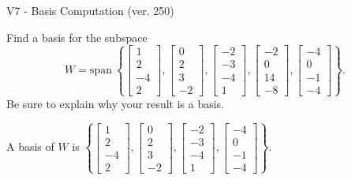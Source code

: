\begin{exercise}
  \begin{exerciseTitle}V7 - Basis Computation (ver. 250)\end{exerciseTitle}
  \begin{exerciseStatement}
    Find a basis for the subspace 
\[W=\mathrm{span}\ \left\{\left[\begin{array}{r}
1 \\
2 \\
-4 \\
2
\end{array}\right] , \left[\begin{array}{r}
0 \\
2 \\
3 \\
-2
\end{array}\right] , \left[\begin{array}{r}
-2 \\
-3 \\
-4 \\
1
\end{array}\right] , \left[\begin{array}{r}
-2 \\
0 \\
14 \\
-8
\end{array}\right] , \left[\begin{array}{r}
-4 \\
0 \\
-1 \\
-4
\end{array}\right]\right\}.\]
 Be sure to explain why your result is a basis.


  \end{exerciseStatement}
  \begin{exerciseAnswer}
   A basis of \(W\) is  \(\left\{\left[\begin{array}{r}
1 \\
2 \\
-4 \\
2
\end{array}\right] , \left[\begin{array}{r}
0 \\
2 \\
3 \\
-2
\end{array}\right] , \left[\begin{array}{r}
-2 \\
-3 \\
-4 \\
1
\end{array}\right] , \left[\begin{array}{r}
-4 \\
0 \\
-1 \\
-4
\end{array}\right]\right\}\).
  


  \end{exerciseAnswer}
\end{exercise}
